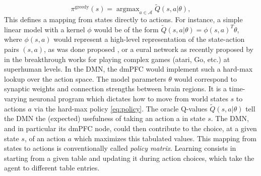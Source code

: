 \documentclass[10pt,letterpaper]{article}
\DeclareMathOperator{\argmax}{argmax}
\begin{document}
\begin{equation}
  \pi^{\text{greedy}}(s) = \argmax_{a \in \mathcal A}\tilde{Q}(s, a|\theta),
  \label{eq:policy}
\end{equation}
This defines a mapping from states directly to actions.
For instance, a simple linear model with a kernel $\phi$ would be of the
form $\tilde{Q}(s, a|\theta) = \phi(s,a)^T\theta$, where
$\phi(s,a)$ would represent a high-level representation of the state-action pairs
$(s,a)$, as was done proposed \citep{songNIPS2016}, or a eural network as recently proposed by in the
breakthrough works
\citep{mnih2015,silver2016mastering} for playing complex games (atari, Go, etc.) at superhuman levels.
In the DMN, the dmPFC would implement such a hard-max lookup
over the action space.
The model
  parameters $\theta$ would correspond to synaptic weights and connection strengths between
  brain regions. It is a time-varying neuronal program which dictates how to move from world states $s$ to actions $a$ via the hard-max policy \eqref{eq:policy}.
  The oracle Q-values $\tilde{Q}(s, a|\theta)$ tell the DMN the (expected) usefulness of taking an action a in state $s$.
  The DMN, and in particular its dmPFC node, could then contribute to the choice, at a given state $s$, of an action $a$ which maximizes this tabulated values. This mapping from states to actions is conventionally called \textit{policy matrix}.
  Learning consists in starting from a given table and
  updating it during action choices,
  which take the agent to different table entries.


\end{document}
